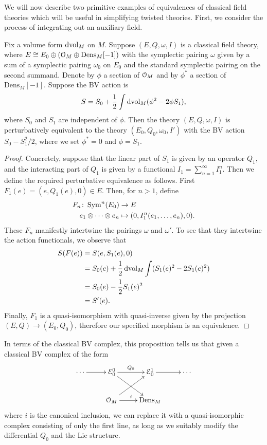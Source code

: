 \documentclass[10pt, oneside]{article}
\newcommand{\Dens}{\mathrm{Dens}}
\begin{document}
We will now describe two primitive examples of equivalences of classical field theories which will be useful in simplifying twisted theories. First, we consider the process of integrating out an auxiliary field.

\begin{prop}
Fix a volume form $\operatorname{dvol}_M$ on $M$. Suppose $(E, Q, \omega, I)$ is a classical field theory, where $E\cong E_0\oplus (\cO_M\oplus \Dens_M[-1])$ with the symplectic pairing $\omega$ given by a sum of a symplectic pairing $\omega_0$ on $E_0$ and the standard symplectic pairing on the second summand. Denote by $\phi$ a section of $\mathcal O_M$ and by $\phi^*$ a section of $\Dens_M[-1]$. Suppose the BV action is
\[S = S_0 + \frac{1}{2} \int \operatorname{dvol}_M (\phi^2 - 2\phi S_1),\]
where $S_0$ and $S_1$ are independent of $\phi$. Then the theory $(E, Q, \omega, I)$ is perturbatively equivalent to the theory $(E_0, Q_0, \omega_0, I')$ with the BV action $S_0 - S_1^2/2$, where we set $\phi^* = 0$ and $\phi = S_1$.
\label{prop:integrateoutfield}
\end{prop}

\begin{proof}
Concretely, suppose that the linear part of $S_1$ is given by an operator $Q_1$, and the interacting part of $Q_1$ is given by a functional $I_1 = \sum_{n=1}^\infty I_1^n$.  Then we define the required perturbative equivalence as follows.  First $F_1(e) = (e, Q_1(e), 0) \in E$.  Then, for $n > 1$, define
\begin{align*}
F_n \colon \operatorname{Sym}^n(E_0) &\to E \\
e_1 \otimes \cdots \otimes e_n &\mapsto (0, I_1^n(e_1, \ldots, e_n), 0).
\end{align*}
These $F_n$ manifestly intertwine the pairings $\omega$ and $\omega'$.  To see that they intertwine the action functionals, we observe that 
\begin{align*}
S(F(e)) &= S(e, S_1(e), 0) \\
&= S_0(e) + \frac 12 \operatorname{dvol}_M \int (S_1(e)^2 - 2 S_1(e)^2) \\
&= S_0(e) - \frac 12 S_1(e)^2 \\
&= S'(e).
\end{align*}
Finally, $F_1$ is a quasi-isomorphism with quasi-inverse given by the projection $(E,Q) \to (E_0,Q_0)$, therefore our specified morphism is an equivalence.
\end{proof}

\begin{remark}
In terms of the classical BV complex, this proposition tells us that given a classical BV complex of the form
\[\xymatrix{
\cdots \ar[r] &\mc E_0^0 \ar[r]^{Q_0} \ar[dr] &\mc E_0^1 \ar[r] &\cdots \\
&\cO_M \ar^{i}[r] \ar[ur] &\dens_M &
}\]
where $i$ is the canonical inclusion, we can replace it with a quasi-isomorphic complex consisting of only the first line, as long as we suitably modify the differential $Q_0$ and the Lie structure.
\end{remark}
\end{document}
